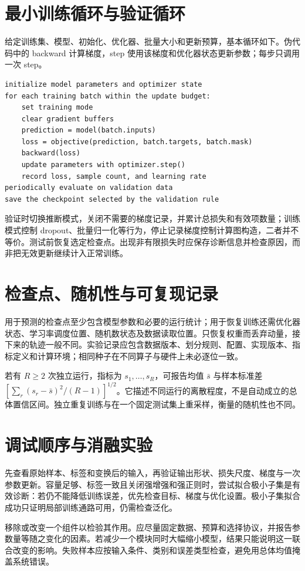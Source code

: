 \documentclass[UTF8,12pt,a4paper,fontset=fandol]{ctexbook}
\begin{document}
\section{最小训练循环与验证循环}
给定训练集、模型、初始化、优化器、批量大小和更新预算，基本循环如下。伪代码中的 backward 计算梯度，step 使用该梯度和优化器状态更新参数；每步只调用一次 step。
\begin{verbatim}
initialize model parameters and optimizer state
for each training batch within the update budget:
    set training mode
    clear gradient buffers
    prediction = model(batch.inputs)
    loss = objective(prediction, batch.targets, batch.mask)
    backward(loss)
    update parameters with optimizer.step()
    record loss, sample count, and learning rate
periodically evaluate on validation data
save the checkpoint selected by the validation rule
\end{verbatim}
验证时切换推断模式，关闭不需要的梯度记录，并累计总损失和有效项数量；训练模式控制 dropout、批量归一化等行为，停止记录梯度控制计算图构造，二者并不等价。测试前恢复选定检查点。出现非有限损失时应保存诊断信息并检查原因，而非把无效更新继续计入正常训练。

\section{检查点、随机性与可复现记录}
用于预测的检查点至少包含模型参数和必要的运行统计；用于恢复训练还需优化器状态、学习率调度位置、随机数状态及数据读取位置。只恢复权重而丢弃动量，接下来的轨迹一般不同。实验记录应包含数据版本、划分规则、配置、实现版本、指标定义和计算环境；相同种子在不同算子与硬件上未必逐位一致。

若有 $R\geq2$ 次独立运行，指标为 $s_1,\ldots,s_R$，可报告均值 $\bar s$ 与样本标准差 $[\sum_r(s_r-\bar s)^2/(R-1)]^{1/2}$。它描述不同运行的离散程度，不是自动成立的总体置信区间。独立重复训练与在一个固定测试集上重采样，衡量的随机性也不同。

\section{调试顺序与消融实验}
先查看原始样本、标签和变换后的输入，再验证输出形状、损失尺度、梯度与一次参数更新。容量足够、标签一致且关闭强增强和强正则时，尝试拟合极小子集是有效诊断：若仍不能降低训练误差，优先检查目标、梯度与优化设置。极小子集拟合成功只证明局部训练通路可用，仍需检查泛化。

移除或改变一个组件以检验其作用。应尽量固定数据、预算和选择协议，并报告参数量等随之变化的因素。若减少一个模块同时大幅缩小模型，结果只能说明这一联合改变的影响。失败样本应按输入条件、类别和误差类型检查，避免用总体均值掩盖系统错误。
\end{document}
